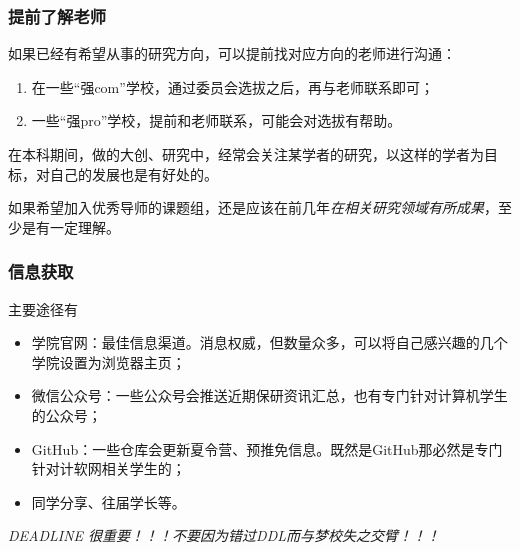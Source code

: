 \begin{frame}
	\frametitle{提前了解老师}

	如果已经有希望从事的研究方向，可以提前找对应方向的老师进行沟通：

	\begin{enumerate}
		\item 在一些“强com”学校，通过委员会选拔之后，再与老师联系即可；
		\item 一些“强pro”学校，提前和老师联系，可能会对选拔有帮助。
	\end{enumerate}

	在本科期间，做的大创、研究中，经常会关注某学者的研究，以这样的学者为目标，对自己的发展也是有好处的。

	如果希望加入优秀导师的课题组，还是应该在前几年\emph{在相关研究领域有所成果}，至少是有一定理解。

\end{frame}

\begin{frame}
	\frametitle{信息获取}

	主要途径有
	\begin{itemize}
		\item 学院官网：最佳信息渠道。消息权威，但数量众多，可以将自己感兴趣的几个学院设置为浏览器主页；
		\item 微信公众号：一些公众号会推送近期保研资讯汇总，也有专门针对计算机学生的公众号；
		\item GitHub：一些仓库会更新夏令营、预推免信息。既然是GitHub那必然是专门针对计软网相关学生的；
		\item 同学分享、往届学长等。
	\end{itemize}

	\emph{DEADLINE 很重要！！！不要因为错过DDL而与梦校失之交臂！！！}

\end{frame}

